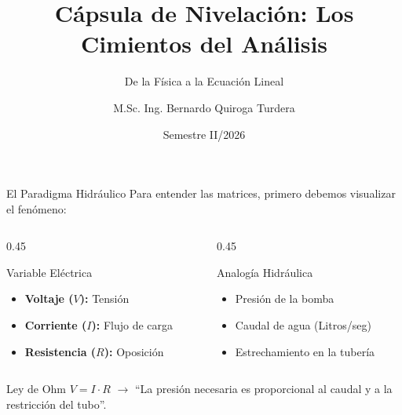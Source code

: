 \documentclass[aspectratio=169, 10pt]{beamer}
\title[Fundamentos: Ohm y Kirchhoff]{Cápsula de Nivelación: Los Cimientos del Análisis}
\subtitle{De la Física a la Ecuación Lineal}
\author[M.Sc. Ing. Bernardo Quiroga]{M.Sc. Ing. Bernardo Quiroga Turdera}
\institute[UCB Tarija]{IMT-121: Circuitos Electrónicos I}
\date{Semestre II/2026}
\begin{document}
\begin{frame}
    \titlepage
\end{frame}

\begin{frame}{El Paradigma Hidráulico}
    Para entender las matrices, primero debemos visualizar el fenómeno:
    
    \vspace{0.3cm}
    \begin{columns}
        \begin{column}{0.45\textwidth}
            \begin{block}{Variable Eléctrica}
                \begin{itemize}
                    \item \textbf{Voltaje ($V$):} Tensión
                    \item \textbf{Corriente ($I$):} Flujo de carga
                    \item \textbf{Resistencia ($R$):} Oposición
                \end{itemize}
            \end{block}
        \end{column}
        
        \begin{column}{0.45\textwidth}
            \begin{block}{Analogía Hidráulica}
                \begin{itemize}
                    \item Presión de la bomba
                    \item Caudal de agua (Litros/seg)
                    \item Estrechamiento en la tubería
                \end{itemize}
            \end{block}
        \end{column}
    \end{columns}
    
    \vspace{0.4cm}
    \begin{alertblock}{Ley de Ohm}
        $V = I \cdot R$ \quad $\rightarrow$ \quad ``La presión necesaria es proporcional al caudal y a la restricción del tubo''.
    \end{alertblock}
\end{frame}
\end{document}
